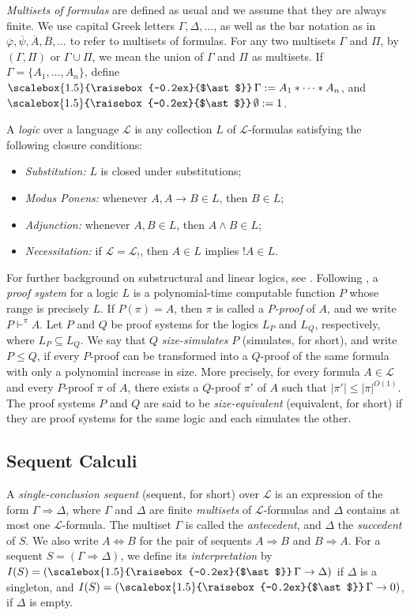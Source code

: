 \documentclass[12pt,a4paper]{article}
\theoremstyle{plain}
\theoremstyle{definition}
\newcommand{\bigast}{\mathop{\scalebox{1.5}{\raisebox{-0.2ex}{$\ast$}}}}%
\renewcommand{\phi}{\varphi}
\begin{document}
\emph{Multisets of formulas} are defined as usual and we assume that they are always finite. We use capital Greek letters $\Gamma, \Delta, \dots$, as well as the bar notation as in $\overline{\phi}, \overline{\psi}, \overline{A}, \overline{B}, \dots$ to refer to multisets of formulas. For any two multisets $\Gamma$ and $\Pi$, by $(\Gamma, \Pi)$ or $\Gamma \cup \Pi$, we mean the union of $\Gamma$ and $\Pi$ as multisets. If $\Gamma= \{A_1,  \dots, A_n\}$, define $\bigast \Gamma:= A_1 * \dots * A_n$, and $\bigast \emptyset :=1$.

A \emph{logic} over a language $\mathcal L$ is any collection $L$ of $\mathcal L$-formulas satisfying the following closure conditions:
\begin{itemize}
\item \emph{Substitution:} $L$ is closed under substitutions;
\item \emph{Modus Ponens:} whenever $A,A\to B\in L$, then $B\in L$;
\item \emph{Adjunction:} whenever $A,B\in L$, then $A\wedge B\in L$;
\item \emph{Necessitation:} if $\mathcal L=\mathcal L_!$, then $A\in L$ implies $!A\in L$.
\end{itemize}

For further background on substructural and linear logics, see \cite{Avron,Ono,Troelstra}.
Following \cite{Cook}, a \emph{proof system} for a logic $L$ is a polynomial-time computable function $P$ whose range is precisely $L$. If $P(\pi)=A$, then $\pi$ is called a \emph{$P$-proof} of $A$, and we write
$P\vdash^\pi A$.
Let $P$ and $Q$ be proof systems for the logics $L_P$ and $L_Q$, respectively, where $L_P \subseteq L_Q$. We say that $Q$ \emph{size-simulates} $P$ (simulates, for short), and write $P \leq Q$, if every $P$-proof can be transformed into a $Q$-proof of the same formula with only a polynomial increase in size. More precisely, for every formula $A \in \mathcal{L}$ and every $P$-proof $\pi$ of $A$, there exists a $Q$-proof $\pi'$ of $A$ such that $|\pi'| \leq |\pi|^{O(1)}$.
The proof systems $P$ and $Q$ are said to be \emph{size-equivalent} (equivalent, for short) if they are proof systems for the same logic and each simulates the other.

\subsection{Sequent Calculi}

A \emph{single-conclusion sequent} (sequent, for short) over $\mathcal{L}$ is an expression of the form $\Gamma \Rightarrow \Delta$, where $\Gamma$ and $\Delta$ are finite \emph{multisets} of $\mathcal{L}$-formulas and $\Delta$ contains at most one $\mathcal{L}$-formula. The multiset $\Gamma$ is called the \emph{antecedent}, and $\Delta$ the \emph{succedent} of $S$. We also write $A \Leftrightarrow B$ for the pair of sequents $A \Rightarrow B$ and $B \Rightarrow A$. For a sequent $S=(\Gamma \Rightarrow \Delta)$, we define its \emph{interpretation} by $I(S)=(\bigast \Gamma \to \Delta)$ if $\Delta$ is a singleton, and $I(S)=(\bigast \Gamma \to 0)$, if $\Delta$ is empty.
\end{document}
